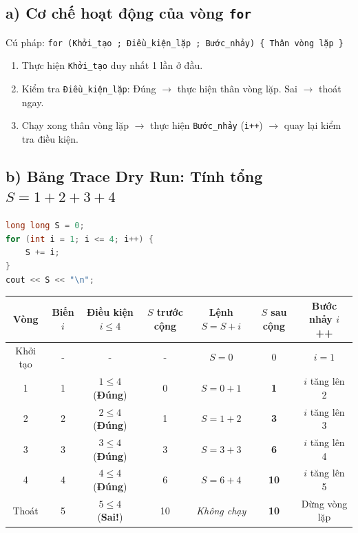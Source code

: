 \documentclass[11pt,a4paper]{article}
\begin{document}
\subsection*{\color{AsianBlue}\small a) Cơ chế hoạt động của vòng \texttt{for}}
Cú pháp: \texttt{for (Khởi\_tạo ; Điều\_kiện\_lặp ; Bước\_nhảy) \{ Thân vòng lặp \}}
\begin{enumerate}
    \setlength{\itemsep}{1pt}
    \small
    \item Thực hiện \texttt{Khởi\_tạo} duy nhất 1 lần ở đầu.
    \item Kiểm tra \texttt{Điều\_kiện\_lặp}: Đúng $\to$ thực hiện thân vòng lặp. Sai $\to$ thoát ngay.
    \item Chạy xong thân vòng lặp $\to$ thực hiện \texttt{Bước\_nhảy} (\texttt{i++}) $\to$ quay lại kiểm tra điều kiện.
\end{enumerate}

\subsection*{\color{AsianBlue}\small b) Bảng Trace Dry Run: Tính tổng $S = 1 + 2 + 3 + 4$}
\begin{lstlisting}[language=C++]
long long S = 0;
for (int i = 1; i <= 4; i++) {
    S += i;
}
cout << S << "\n";
\end{lstlisting}

\begin{center}
\footnotesize
\begin{tabular}{@{}ccccccc@{}}
\toprule
\textbf{Vòng} & \textbf{Biến $i$} & \textbf{Điều kiện $i \le 4$} & \textbf{$S$ trước cộng} & \textbf{Lệnh $S = S + i$} & \textbf{$S$ sau cộng} & \textbf{Bước nhảy $i$++} \\
\midrule
Khởi tạo & - & - & - & $S = 0$ & 0 & $i = 1$ \\
1 & 1 & $1 \le 4$ (\textbf{Đúng}) & 0 & $S = 0 + 1$ & \textbf{1} & $i$ tăng lên 2 \\
2 & 2 & $2 \le 4$ (\textbf{Đúng}) & 1 & $S = 1 + 2$ & \textbf{3} & $i$ tăng lên 3 \\
3 & 3 & $3 \le 4$ (\textbf{Đúng}) & 3 & $S = 3 + 3$ & \textbf{6} & $i$ tăng lên 4 \\
4 & 4 & $4 \le 4$ (\textbf{Đúng}) & 6 & $S = 6 + 4$ & \textbf{10} & $i$ tăng lên 5 \\
Thoát & 5 & $5 \le 4$ (\textbf{Sai!}) & 10 & \textit{Không chạy} & \textbf{10} & Dừng vòng lặp \\
\bottomrule
\end{tabular}
\end{center}
\end{document}
